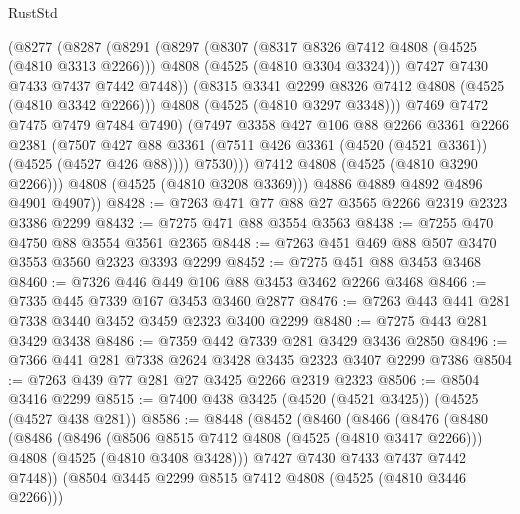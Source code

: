 \begin{lexlean}{RustStd}
\begin{coremodule}
                (@8277
                  (@8287
                    (@8291
                      (@8297
                        (@8307
                          (@8317 @8326 @7412 @4808 (@4525 (@4810 @3313 @2266)))
                          @4808
                          (@4525 (@4810 @3304 @3324)))
                        @7427
                        @7430
                        @7433
                        @7437
                        @7442
                        @7448))
                    (@8315 @3341 @2299 @8326 @7412 @4808 (@4525 (@4810 @3342 @2266)))
                    @4808
                    (@4525 (@4810 @3297 @3348)))
                  @7469
                  @7472
                  @7475
                  @7479
                  @7484
                  @7490)
                (@7497
                  @3358
                  @427
                  @106
                  @88
                  @2266
                  @3361
                  @2266
                  @2381
                  (@7507
                    @427
                    @88
                    @3361
                    (@7511 @426 @3361 (@4520 (@4521 @3361)) (@4525 (@4527 @426 @88))))
                  @7530)))
            @7412
            @4808
            (@4525 (@4810 @3290 @2266)))
          @4808
          (@4525 (@4810 @3208 @3369)))
        @4886
        @4889
        @4892
        @4896
        @4901
        @4907))
@8428 := @7263 @471 @77 @88 @27 @3565 @2266 @2319 @2323 @3386 @2299
@8432 := @7275 @471 @88 @3554 @3563
@8438 := @7255 @470 @4750 @88 @3554 @3561 @2365
@8448 := @7263 @451 @469 @88 @507 @3470 @3553 @3560 @2323 @3393 @2299
@8452 := @7275 @451 @88 @3453 @3468
@8460 := @7326 @446 @449 @106 @88 @3453 @3462 @2266 @3468
@8466 := @7335 @445 @7339 @167 @3453 @3460 @2877
@8476 := @7263 @443 @441 @281 @7338 @3440 @3452 @3459 @2323 @3400 @2299
@8480 := @7275 @443 @281 @3429 @3438
@8486 := @7359 @442 @7339 @281 @3429 @3436 @2850
@8496 := @7366 @441 @281 @7338 @2624 @3428 @3435 @2323 @3407 @2299 @7386
@8504 := @7263 @439 @77 @281 @27 @3425 @2266 @2319 @2323
@8506 := @8504 @3416 @2299
@8515 := @7400 @438 @3425 (@4520 (@4521 @3425)) (@4525 (@4527 @438 @281))
@8586 := @8448
    (@8452
      (@8460
        (@8466
          (@8476
            (@8480
              (@8486
                (@8496
                  (@8506 @8515 @7412 @4808 (@4525 (@4810 @3417 @2266)))
                  @4808
                  (@4525 (@4810 @3408 @3428)))
                @7427
                @7430
                @7433
                @7437
                @7442
                @7448))
            (@8504 @3445 @2299 @8515 @7412 @4808 (@4525 (@4810 @3446 @2266)))

\end{coremodule}
\end{lexlean}
